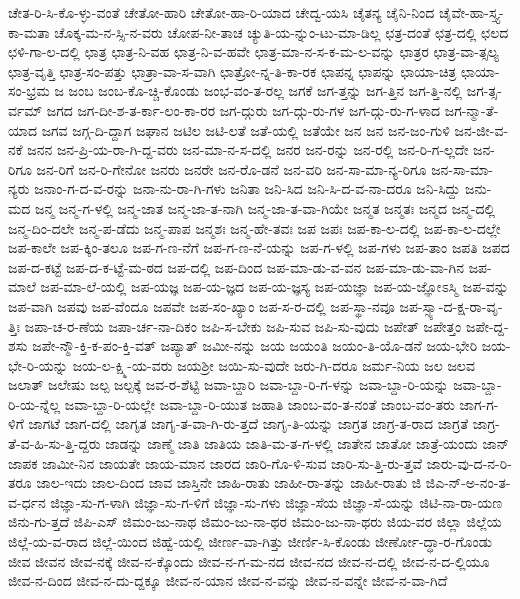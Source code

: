 {ಚೇತ-ರಿ-ಸಿ-ಕೊ-ಳ್ಳು-ವಂತೆ
ಚೇತೋ-ಹಾರಿ
ಚೇತೋ-ಹಾ-ರಿ-ಯಾದ
ಚೇದ್ವ-ಯಸಿ
ಚೈತನ್ಯ
ಚೈನಿ-ನಿಂದ
ಚೈವೇ-ಹಾ-ಸ್ತ್ಯ-ಕಾ-ಮತಾ
ಚೊಕ್ಕ-ಮ-ನ-ಸ್ಸಿ-ನ-ವರು
ಚೋಪ-ನೀ-ತಾಚ
ಚ್ಯುತಿ-ಯ-ನ್ನುಂ-ಟು-ಮಾ-ಡಿಲ್ಲ
ಛತ್ರ-ದಂತೆ
ಛತ್ರ-ದಲ್ಲಿ
ಛಲದ
ಛಳಿ-ಗಾ-ಲ-ದಲ್ಲಿ
ಛಾತ್ರ
ಛಾತ್ರ-ನಿ-ವಹ
ಛಾತ್ರ-ನಿ-ವ-ಹವೇ
ಛಾತ್ರ-ಮಾ-ನ-ಸ-ಕ-ಮ-ಲ-ವನ್ನು
ಛಾತ್ರರ
ಛಾತ್ರ-ವಾ-ತ್ಸಲ್ಯ
ಛಾತ್ರ-ವೃತ್ತಿ
ಛಾತ್ರ-ಸಂ-ಪತ್ತು
ಛಾತ್ರಾ-ವಾ-ಸ-ವಾಗಿ
ಛಾತ್ರೋ-ನ್ನ-ತಿ-ಕಾ-ರಕ
ಛಾಪನ್ನ
ಛಾಪನ್ನು
ಛಾಯಾ-ಚಿತ್ರ
ಛಾಯಾ-ಸಂ-ಭ್ರಮ
ಜ
ಜಂಬ
ಜಂಬ-ಕೊ-ಚ್ಚಿ-ಕೊಂಡು
ಜಂಭ-ವಂ-ತ-ರಲ್ಲ
ಜಗಕೆ
ಜಗ-ತ್ತನ್ನು
ಜಗ-ತ್ತಿನ
ಜಗ-ತ್ತಿ-ನಲ್ಲಿ
ಜಗ-ತ್ಸ-ರ್ವಮ್
ಜಗದ
ಜಗ-ದೀ-ಶ-ತ-ರ್ಕಾ-ಲಂ-ಕಾ-ರರ
ಜಗ-ದ್ಗುರು
ಜಗ-ದ್ಗು-ರು-ಗಳ
ಜಗ-ದ್ಗು-ರು-ಗ-ಳಾದ
ಜಗ-ನ್ಮಾ-ತೆ-ಯಾದ
ಜಗವ
ಜಗ್ಗ-ದಿ-ದ್ದಾಗ
ಜಘಾನ
ಜಟಿಲ
ಜಟಿ-ಲತೆ
ಜತೆ-ಯಲ್ಲಿ
ಜತೆಯೇ
ಜನ
ಜನ
ಜನ-ಜಂ-ಗುಳಿ
ಜನ-ಜೀ-ವ-ನಕೆ
ಜನನ
ಜನ-ಪ್ರಿ-ಯ-ರಾ-ಗಿ-ದ್ದ-ವರು
ಜನ-ಮಾ-ನ-ಸ-ದಲ್ಲಿ
ಜನರ
ಜನ-ರನ್ನು
ಜನ-ರಲ್ಲಿ
ಜನ-ರಿ-ಗ-ಲ್ಲದೇ
ಜನ-ರಿಗೂ
ಜನ-ರಿಗೆ
ಜನ-ರಿ-ಗೇನೋ
ಜನರು
ಜನರೇ
ಜನ-ರೊ-ಡನೆ
ಜನ-ವರಿ
ಜನ-ಸಾ-ಮಾ-ನ್ಯ-ರಿಗೂ
ಜನ-ಸಾ-ಮಾ-ನ್ಯರು
ಜನಾಂ-ಗ-ದ-ವ-ರನ್ನು
ಜನಾ-ನು-ರಾ-ಗಿ-ಗಳು
ಜನಿತಾ
ಜನಿ-ಸಿದ
ಜನಿ-ಸಿ-ದ-ವ-ನಾ-ದರೂ
ಜನಿ-ಸಿದ್ದು
ಜನು-ಮದ
ಜನ್ಮ
ಜನ್ಮ-ಗ-ಳಲ್ಲಿ
ಜನ್ಮ-ಜಾತ
ಜನ್ಮ-ಜಾ-ತ-ನಾಗಿ
ಜನ್ಮ-ಜಾ-ತ-ವಾ-ಗಿಯೇ
ಜನ್ಮತ
ಜನ್ಮತಃ
ಜನ್ಮದ
ಜನ್ಮ-ದಲ್ಲಿ
ಜನ್ಮ-ದಿಂ-ದಲೇ
ಜನ್ಮ-ಪ-ಡೆದು
ಜನ್ಮ-ಪಾಪ
ಜನ್ಮಶಃ
ಜನ್ಮ-ಹೇ-ತವಃ
ಜಪ
ಜಪಃ
ಜಪ-ಕಾ-ಲ-ದಲ್ಲಿ
ಜಪ-ಕಾ-ಲ-ದಲ್ಲೇ
ಜಪ-ಕಾಲೇ
ಜಪ-ಕ್ಕಿಂ-ತಲೂ
ಜಪ-ಗ-ಣ-ನೆಗೆ
ಜಪ-ಗ-ಣ-ನೆ-ಯನ್ನು
ಜಪ-ಗ-ಳಲ್ಲಿ
ಜಪ-ಗಳು
ಜಪ-ತಾಂ
ಜಪತಿ
ಜಪದ
ಜಪ-ದ-ಕಟ್ಟೆ
ಜಪ-ದ-ಕ-ಟ್ಟೆ-ಮ-ಠದ
ಜಪ-ದಲ್ಲಿ
ಜಪ-ದಿಂದ
ಜಪ-ಮಾ-ಡು-ವ-ವನ
ಜಪ-ಮಾ-ಡು-ವಾ-ಗಿನ
ಜಪ-ಮಾಲೆ
ಜಪ-ಮಾ-ಲೆ-ಯಲ್ಲಿ
ಜಪ-ಯಜ್ಞ
ಜಪ-ಯ-ಜ್ಞದ
ಜಪ-ಯ-ಜ್ಞಸ್ಯ
ಜಪ-ಯಜ್ಞಾ
ಜಪ-ಯ-ಜ್ಞೋಽಸ್ಮಿ
ಜಪ-ವನ್ನು
ಜಪ-ವಾಗಿ
ಜಪವು
ಜಪ-ವೆಂದೂ
ಜಪವೇ
ಜಪ-ಸಂ-ಖ್ಯಾಂ
ಜಪ-ಸ-ರ-ದಲ್ಲಿ
ಜಪ-ಸ್ಥಾ-ನವೂ
ಜಪ-ಸ್ಸ್ಯಾ-ದ-ಕ್ಷ-ರಾ-ವೃ-ತ್ತಿಃ
ಜಪಾ-ಚ-ರ-ಣೆಯ
ಜಪಾ-ರ್ಚ-ನಾ-ದಿಕಂ
ಜಪಿ-ಸ-ಬೇಕು
ಜಪಿ-ಸುವ
ಜಪಿ-ಸು-ವುದು
ಜಪೇತ್
ಜಪೇತ್ತಂ
ಜಪೇ-ದ್ದ-ಶಸು
ಜಪೇ-ನ್ಮೌ-ಕ್ತಿ-ಕ-ಪಂ-ಕ್ತಿ-ವತ್
ಜಪ್ಯಾತ್
ಜಮೀ-ನನ್ನು
ಜಯ
ಜಯಂತಿ
ಜಯಂ-ತಿ-ಯೊ-ಡನೆ
ಜಯ-ಭೇರಿ
ಜಯ-ಭೇ-ರಿ-ಯನ್ನು
ಜಯ-ಲ-ಕ್ಷ್ಮಿ-ಯ-ವರು
ಜಯಶ್ರೀ
ಜಯಿ-ಸು-ವುದೇ
ಜರು-ಗಿ-ದರೂ
ಜರ್ಮ-ನಿಯ
ಜಲ
ಜಲವ
ಜಲಾತ್
ಜಲೇಷು
ಜಲ್ಪ
ಜಲ್ಪಕ್ಕೆ
ಜವ-ರ-ಶೆಟ್ಟಿ
ಜವಾ-ಬ್ದಾರಿ
ಜವಾ-ಬ್ದಾ-ರಿ-ಗ-ಳನ್ನು
ಜವಾ-ಬ್ದಾ-ರಿ-ಯನ್ನು
ಜವಾ-ಬ್ದಾ-ರಿ-ಯ-ನ್ನೆಲ್ಲ
ಜವಾ-ಬ್ದಾ-ರಿ-ಯಲ್ಲೇ
ಜವಾ-ಬ್ದಾ-ರಿ-ಯುತ
ಜಹಾತಿ
ಜಾಂಬ-ವಂ-ತ-ನಂತೆ
ಜಾಂಬ-ವಂ-ತರು
ಜಾಗ-ಗ-ಳಿಗೆ
ಜಾಗಟೆ
ಜಾಗ-ದಲ್ಲಿ
ಜಾಗೃತ
ಜಾಗೃ-ತ-ವಾ-ಗಿ-ರು-ತ್ತದೆ
ಜಾಗೃ-ತಿ-ಯನ್ನು
ಜಾಗ್ರತ
ಜಾಗ್ರ-ತ-ರಾದ
ಜಾಗ್ರತೆ
ಜಾಗ್ರ-ತೆ-ವ-ಹಿ-ಸು-ತ್ತಿ-ದ್ದರು
ಜಾಡನ್ನು
ಜಾಣ್ಮೆ
ಜಾತಿ
ಜಾತಿಯ
ಜಾತಿ-ಮ-ತ-ಗ-ಳಲ್ಲಿ
ಜಾತೇನ
ಜಾತೋ
ಜಾತ್ರೆ-ಯಂದು
ಜಾನ್
ಜಾಪಕ
ಜಾಮೀ-ನಿನ
ಜಾಯತೇ
ಜಾಯ-ಮಾನ
ಜಾರದ
ಜಾರಿ-ಗೊ-ಳಿ-ಸುವ
ಜಾರಿ-ಸು-ತ್ತಿ-ರು-ತ್ತವೆ
ಜಾರು-ವು-ದ-ನ-ರಿ-ತರೂ
ಜಾಲ-ಇದು
ಜಾಲ-ದಿಂದ
ಜಾವ
ಜಾಸ್ತಿನೇ
ಜಾಹಿ-ರಾತು
ಜಾಹೀ-ರಾ-ತನ್ನು
ಜಾಹೀ-ರಾತು
ಜಿ
ಜಿಎ-ನ್-ಅ-ನಂ-ತ-ವ-ರ್ಧನ
ಜಿಜ್ಞಾ-ಸು-ಗ-ಳಾಗಿ
ಜಿಜ್ಞಾ-ಸು-ಗ-ಳಿಗೆ
ಜಿಜ್ಞಾ-ಸು-ಗಳು
ಜಿಜ್ಞಾ-ಸೆಯ
ಜಿಜ್ಞಾ-ಸೆ-ಯನ್ನು
ಜಿಟಿ-ನಾ-ರಾ-ಯಣ
ಜಿನು-ಗು-ತ್ತದೆ
ಜಿಪಿ-ಎಸ್
ಜಿಮಂ-ಜು-ನಾಥ
ಜಿಮಂ-ಜು-ನಾ-ಥರ
ಜಿಮಂ-ಜು-ನಾ-ಥರು
ಜಿಯ-ವರ
ಜಿಲ್ಲಾ
ಜಿಲ್ಲೆಯ
ಜಿಲ್ಲೆ-ಯ-ವ-ರಾದ
ಜಿಲ್ಲೆ-ಯಿಂದ
ಜಿಹ್ವೆ-ಯಲ್ಲಿ
ಜೀರ್ಣ-ವಾ-ಗಿತ್ತು
ಜೀರ್ಣಿ-ಸಿ-ಕೊಂಡು
ಜೀರ್ಣೋ-ದ್ಧಾ-ರ-ಗೊಂಡು
ಜೀವ
ಜೀವನ
ಜೀವ-ನಕ್ಕೆ
ಜೀವ-ನ-ಕ್ಕೊಂದು
ಜೀವ-ನ-ಗ-ಮ-ನದ
ಜೀವ-ನದ
ಜೀವ-ನ-ದಲ್ಲಿ
ಜೀವ-ನ-ದ-ಲ್ಲಿಯೂ
ಜೀವ-ನ-ದಿಂದ
ಜೀವ-ನ-ದು-ದ್ದಕ್ಕೂ
ಜೀವ-ನ-ಯಾನ
ಜೀವ-ನ-ವನ್ನು
ಜೀವ-ನ-ವನ್ನೇ
ಜೀವ-ನ-ವಾ-ಗಿದೆ
}

